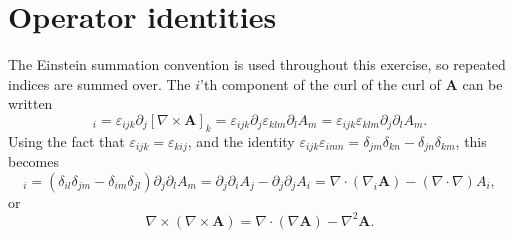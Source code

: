 \documentclass{article}
\begin{document}
    \section{Operator identities}
        The Einstein summation convention is used throughout this exercise, so repeated indices are summed over. The $i$'th component of the curl of the curl of $\mathbf{A}$ can be written
        \begin{equation*}
            [\nabla \times (\nabla \times \mathbf{A})]_i = \varepsilon_{ijk} \partial_j[\nabla \times \mathbf{A}]_k = \varepsilon_{ijk} \partial_j \varepsilon_{klm} \partial_l A_m = \varepsilon_{ijk} \varepsilon_{klm} \partial_j \partial_l A_m.
        \end{equation*}
        Using the fact that $\varepsilon_{ijk} = \varepsilon_{kij}$, and the identity $\varepsilon_{ijk}\varepsilon_{imn} = \delta_{jm} \delta_{kn} - \delta_{jn}\delta_{km}$, this becomes
        \begin{equation*}
            [\nabla \times (\nabla \times \mathbf{A})]_i = (\delta_{il}\delta_{jm} - \delta_{im}\delta_{jl}) \partial_j \partial_l A_m = \partial_j \partial_i A_j - \partial_j \partial_j A_i = \nabla \cdot (\nabla_i \mathbf{A}) - (\nabla \cdot \nabla) A_i,
        \end{equation*}
        or
        \begin{equation*}
            \nabla \times (\nabla \times \mathbf{A}) = \nabla \cdot (\nabla \mathbf{A}) - \nabla^2 \mathbf{A}.
        \end{equation*}
\end{document}
